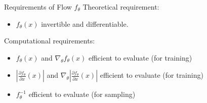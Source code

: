 \begin{frame}[allowframebreaks]

\begin{myconceptblock}{10.9}{Requirements of Flow $f_{\theta}$}
    Theoretical requirement:

    \begin{itemize}
        \item $f_{\theta}(x)$ invertible and differentiable.
    \end{itemize}

    Computational requirements:

    \begin{itemize}
        \item $f_{\theta}(x)$ and $\nabla_{\theta} f_{\theta}(x)$ efficient to evaluate (for training)
        \item $\left|\frac{\partial f_{\theta}}{\partial x}(x)\right|$ and $\nabla_{\theta}\left|\frac{\partial f_{\theta}}{\partial x}(x)\right|$ efficient to evaluate (for training)
        \item $f_{\theta}^{-1}$ efficient to evaluate (for sampling)
    \end{itemize}
\end{myconceptblock}

\end{frame}

